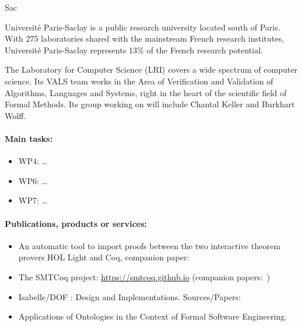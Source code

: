 \begin{sitedescription}{Sac}

Université Paris-Saclay is a public research university located south of
Paris. With 275 laboratories shared with the mainstream French research
institutes, Université Paris-Saclay represents 13\% of the French
research potential.

The Laboratory for Computer Science (LRI) covers a wide spectrum of
computer science. Its VALS team works in the Area of Verification and
Validation of Algorithms, Languages and Systems, right in the heart of
the scientific field of Formal Methods. Its group working on \pn will
include Chantal Keller and Burkhart Wolff.

\paragraph{Main tasks:}

\begin{itemize}
\item WP4: \dots
\item WP6: \dots
\item WP7: \dots
\end{itemize}

\begin{compactitem}
\item{} 
\end{compactitem}

\paragraph{Publications, products or services:}


\begin{itemize}
\item An automatic tool to import proofs between the two interactive
  theorem provers HOL Light and Coq, companion
  paper:~\cite{DBLP:conf/itp/KellerW10}
\item The SMTCoq project: \url{https://smtcoq.github.io} (companion
  papers:~\cite{DBLP:conf/cpp/ArmandFGKTW11,DBLP:conf/cav/EkiciMTKKRB17})
\item Isabelle/DOF : Design and Implementations.
 Sources/Papers: \cite{brucker_achim_d_2019_3370483,brucker.ea:isabelle-ontologies:2018}
\item Applications of Ontologies in the Context of Formal Software Engineering.
 \cite{brucker.ea:ontologies-certification:2019}
\end{itemize}


\end{sitedescription}
